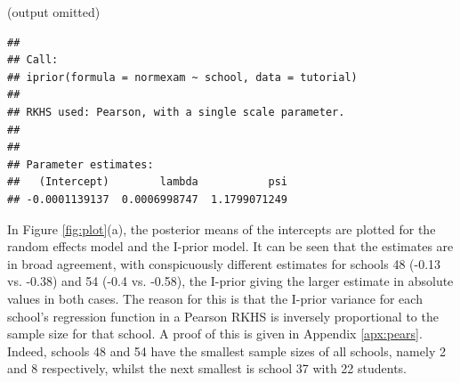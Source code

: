 \begin{knitrout}
\color{fgcolor}\begin{kframe}
\begin{alltt}
 \hlkwb{<-}  \hlopt{~}   
\end{alltt}
\end{kframe}
\end{knitrout}
(output omitted)
\begin{knitrout}
\color{fgcolor}\begin{kframe}
\begin{verbatim}
## 
## Call:
## iprior(formula = normexam ~ school, data = tutorial)
## 
## RKHS used: Pearson, with a single scale parameter.
## 
## 
## Parameter estimates:
##   (Intercept)        lambda           psi 
## -0.0001139137  0.0006998747  1.1799071249
\end{verbatim}
\end{kframe}
\end{knitrout}

In Figure \ref{fig:plot}(a), the posterior means of the intercepts are plotted for the random effects model and the I-prior model. It can be seen that the estimates are in broad agreement, with conspicuously different estimates for schools 48 (-0.13 vs. -0.38) and 54 (-0.4 vs. -0.58), the I-prior giving the larger estimate in absolute values in both cases. The reason for this is that the I-prior variance for each school's regression function in a Pearson RKHS is inversely proportional to the sample size for that school. A proof of this is given in Appendix \ref{apx:pears}. Indeed, schools 48 and 54 have the smallest sample sizes of all schools, namely 2 and 8 respectively, whilst the next smallest is school 37 with 22 students.

